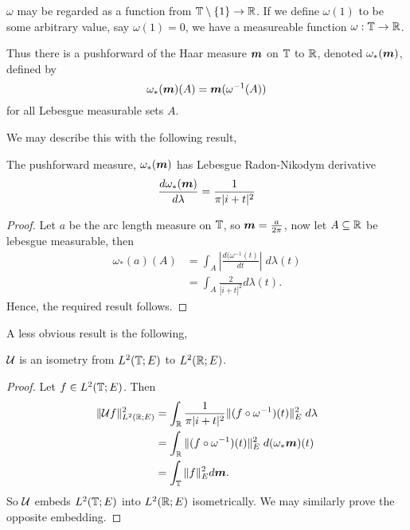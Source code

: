 \documentclass{unswmaths}
\begin{document}
$\omega$ may be regarded as a function from $\mathbb{T}\setminus\{1\}\rightarrow \mathbb{R}$. 
If we define $\omega(1)$ to be some arbitrary value, say $\omega(1) = 0$, we
have a measureable function $\omega:\mathbb{T}\rightarrow\mathbb{R}$.

Thus there is a pushforward of the Haar measure $\boldsymbol{m}$ on $\mathbb{T}$
to $\mathbb{R}$, denoted $\omega_*(\boldsymbol{m})$, defined
by
\begin{equation*}
    \omega_*(\boldsymbol{m})(A) = \boldsymbol{m}(\omega^{-1}(A))    
\end{equation*}
for all Lebesgue measurable sets $A$.


We may describe this with the following result,
\begin{lemma}
    The pushforward measure, $\omega_*(\boldsymbol{m})$ has Lebesgue Radon-Nikodym 
    derivative
    \begin{equation*}
        \frac{d\omega_*(\boldsymbol{m})}{d\lambda} = \frac{1}{\pi|i+t|^2}
    \end{equation*}
\end{lemma}
\begin{proof}
    Let $a$ be the arc length measure on $\mathbb{T}$, so $\boldsymbol{m} = \frac{a}{2\pi}$, now
    let $A \subseteq \mathbb{R}$ be lebesgue measurable, then
    \begin{align*}
        \omega_*(a)(A) &= \int_A \left|\frac{d(\omega^{-1}(t)}{dt}\right|\;d\lambda(t)\\
        &= \int_A \frac{2}{|i+t|^2}d\lambda(t).
    \end{align*}
    Hence, the required result follows.
\end{proof}


A less obvious result is the following, 
\begin{theorem}
    $\mathcal{U}$ is an isometry from $L^2(\mathbb{T};E)$ to $L^2(\mathbb{R};E)$. 
\end{theorem}
\begin{proof}
    Let $f \in L^2(\mathbb{T};E)$. Then
    \begin{align*}
        \|\mathcal{U} f\|_{L^2(\mathbb{R};E)}^2 &= \int_{\mathbb{R}} \frac{1}{\pi|i+t|^2}\|(f\circ\omega^{-1})(t)\|_E^2\;d\lambda\\
        &= \int_{\mathbb{R}} \|(f\circ\omega^{-1})(t)\|_E^2\;d(\omega_*\boldsymbol{m})(t)\\
        &= \int_{\mathbb{T}} \|f\|_E^2 d\boldsymbol{m}.
    \end{align*}
    So $\mathcal{U}$ embeds $L^2(\mathbb{T};E)$ into $L^2(\mathbb{R};E)$ isometrically.
    We may similarly prove the opposite embedding.
\end{proof}
\end{document}
